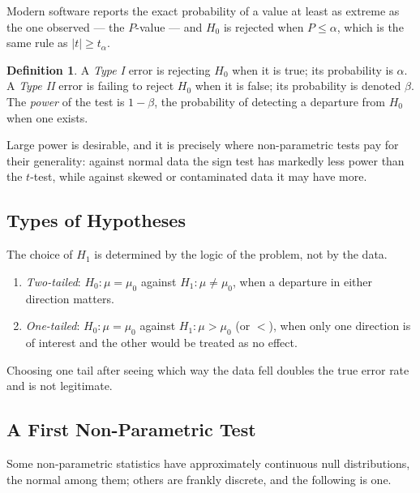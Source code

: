 \documentclass[11pt,a4paper]{article}
\theoremstyle{definition}
\newtheorem{definition}[thm]{Definition}
\begin{document}
Modern software reports the exact probability of a value at least as extreme as the
one observed --- the $P$-value --- and $H_0$ is rejected when
$P \leq \alpha$, which is the same rule as $\left|t\right| \geq t_\alpha$.

\begin{definition}
A \emph{Type I} error is rejecting $H_0$ when it is true; its probability is
$\alpha$. A \emph{Type II} error is failing to reject $H_0$ when it is false; its
probability is denoted $\beta$. The \emph{power} of the test is $1 - \beta$, the
probability of detecting a departure from $H_0$ when one exists.
\end{definition}

Large power is desirable, and it is precisely where non-parametric tests pay for
their generality: against normal data the sign test has markedly less power than
the $t$-test, while against skewed or contaminated data it may have more.

\subsection{Types of Hypotheses}

The choice of $H_1$ is determined by the logic of the problem, not by the data.
\begin{enumerate}
\item[(i).] \emph{Two-tailed}: $H_0 : \mu = \mu_0$ against
$H_1 : \mu \neq \mu_0$, when a departure in either direction matters.
\item[(ii).] \emph{One-tailed}: $H_0 : \mu = \mu_0$ against
$H_1 : \mu > \mu_0$ (or $<$), when only one direction is of interest and the other
would be treated as no effect.
\end{enumerate}
Choosing one tail after seeing which way the data fell doubles the true error rate
and is not legitimate.

\subsection{A First Non-Parametric Test}

Some non-parametric statistics have approximately continuous null distributions,
the normal among them; others are frankly discrete, and the following is one.
\end{document}
